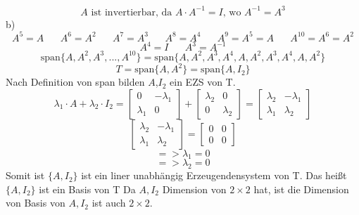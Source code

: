 \documentclass[11pt]{article}
\begin{document}
					$$A \text{ ist invertierbar, da } A\cdot A^{-1}=I \text{, wo } A^{-1}=A^3$$
				\indent b)\\
					$$A^5=A \hspace{20pt} A^6=A^2 \hspace{20pt} A^7=A^3 \hspace{20pt} A^8=A^4 \hspace{20pt} A^9=A^5=A \hspace{20pt} A^{10}=A^6=A^2$$
					$$A^4=I \hspace{20pt} A^3=A^{-1}$$
					$$\text{span}\{A,A^2,A^3,...,A^{10}\}=\text{span}\{A,A^2,A^3,A^4,A,A^2,A^3,A^4,A,A^2\}$$
					$$T=\text{span}\{A,A^2\}=\text{span}\{A,I_2\}$$
					Nach Definition von span bilden $A$,$I_2$ ein EZS von T.\\
					$$\lambda_1\cdot A+\lambda_2\cdot I_2=\begin{bmatrix}0&-\lambda_1\\\lambda_1&0\end{bmatrix}+\begin{bmatrix}\lambda_2&0\\0&\lambda_2\end{bmatrix}=\begin{bmatrix}\lambda_2&-\lambda_1\\\lambda_1&\lambda_2\end{bmatrix}$$
					$$\begin{bmatrix}\lambda_2&-\lambda_1\\\lambda_1&\lambda_2\end{bmatrix}=\begin{bmatrix}0&0\\0&0\end{bmatrix}$$
					$$=>\lambda_1=0$$
					$$=>\lambda_2=0$$
					Somit ist $\{A,I_2\}$ ist ein liner unabhängig Erzeugendensystem von T. Das heißt $\{A,I_2\}$ ist ein Basis von T
					Da $A,I_2$ Dimension von $2\times 2$ hat, ist die Dimension von Basis von $A,I_2$ ist auch $2\times2$.\\
\end{document}
